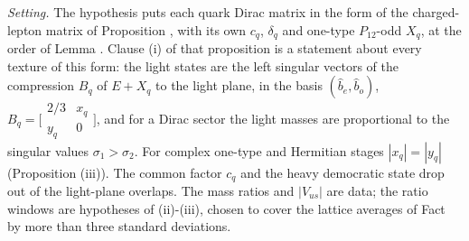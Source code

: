 \emph{Setting.} The hypothesis puts each quark Dirac matrix in the form of the charged-lepton matrix of Proposition , with its own $c_{q}$, $\delta_{q}$ and one-type $P_{12}$-odd $X_{q}$, at the order of Lemma . Clause (i) of that proposition is a statement about every texture of this form: the light states are the left singular vectors of the compression $B_{q}$ of $E + X_{q}$ to the light plane, in the basis $(\hat{b}_{e}, \hat{b}_{o})$, $B_{q} = \bigl[\begin{smallmatrix} 2/3 & x_{q} \\ y_{q} & 0\end{smallmatrix}\bigr]$, and for a Dirac sector the light masses are proportional to the singular values $\sigma_{1} > \sigma_{2}$. For complex one-type and Hermitian stages $|x_{q}| = |y_{q}|$ (Proposition (iii)). The common factor $c_{q}$ and the heavy democratic state drop out of the light-plane overlaps. The mass ratios and $|V_{us}|$ are data; the ratio windows are hypotheses of (ii)-(iii), chosen to cover the lattice averages of Fact  by more than three standard deviations.

